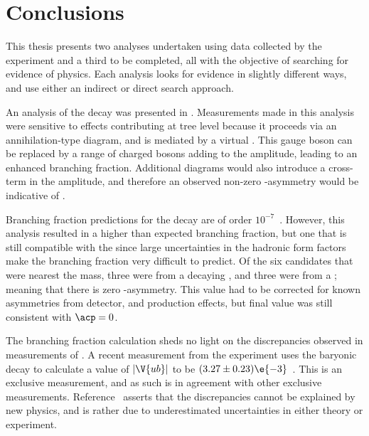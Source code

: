 \chapter{Conclusions}
\label{ch:conc}


This thesis presents two analyses undertaken using data collected by the \lhcb experiment
and a third to be completed, all
with the objective of searching for evidence of \bsm physics.
Each analysis looks for evidence in slightly different ways, and use either an indirect or direct
search approach.

An analysis of the decay \btodsphi was presented in .
Measurements made in this analysis were sensitive to \np effects contributing at tree
level because it proceeds via an annihilation-type diagram, and is mediated by a virtual \Wp.
This gauge boson can be replaced by a range of charged bosons adding to the amplitude, leading to
an enhanced branching fraction.
Additional \np diagrams would also introduce a cross-term in the amplitude, and therefore an
observed non-zero \CP-asymmetry would be indicative of \np.

Branching fraction predictions for the decay \btodsphi are of order
$10^{-7}$~\cite{Zou:2009zza,Mohanta:2002wf,PhysRevD.76.057701,Lu:2001yz}.
However, this analysis resulted in a higher than expected branching fraction, but one that is
still compatible with the \sm since large uncertainties in the hadronic form factors make the
branching fraction very difficult to predict.
Of the six candidates that were nearest the \Bp mass, three were from a decaying \Bp, and three
were from a \Bm; meaning that there is zero \CP-asymmetry.
This value had to be corrected for known asymmetries from detector, and production effects, but
final value was still consistent with $\acp=0$.

The branching fraction calculation sheds no light on the discrepancies observed in measurements of
.
A recent measurement from the \lhcb experiment uses the baryonic decay  to
calculate a value of $\left|\V{ub}\right|$ to be $(3.27\pm0.23)\e{-3}$~\cite{Aaij:2015bfa}.
This is an exclusive measurement, and as such is in agreement with other exclusive measurements.
Reference~\cite{Crivellin:2014zpa} asserts that the
discrepancies cannot be explained by new physics, and is rather due to underestimated uncertainties
in either theory or experiment.

